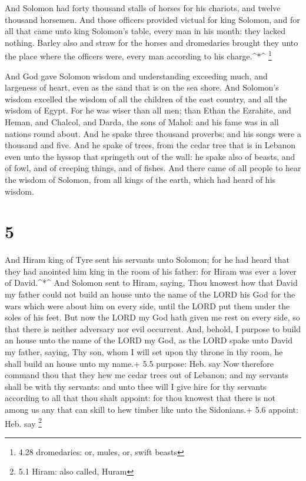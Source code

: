  And Solomon had forty thousand stalls of horses for his
chariots, and twelve thousand horsemen.  And those officers
provided victual for king Solomon, and for all that came unto king
Solomon's table, every man in his month: they lacked nothing.
 Barley also and straw for the horses and dromedaries
brought they unto the place where the officers were, every man according
to his charge.\^{}*\^{} \footnote{4.28 dromedaries: or, mules, or, swift
  beasts}

 And God gave Solomon wisdom and understanding exceeding
much, and largeness of heart, even as the sand that is on the sea shore.
 And Solomon's wisdom excelled the wisdom of all the
children of the east country, and all the wisdom of Egypt. 
For he was wiser than all men; than Ethan the Ezrahite, and Heman, and
Chalcol, and Darda, the sons of Mahol: and his fame was in all nations
round about.  And he spake three thousand proverbs: and his
songs were a thousand and five.  And he spake of trees,
from the cedar tree that is in Lebanon even unto the hyssop that
springeth out of the wall: he spake also of beasts, and of fowl, and of
creeping things, and of fishes.  And there came of all
people to hear the wisdom of Solomon, from all kings of the earth, which
had heard of his wisdom.

\hypertarget{section-4}{%
\section{5}\label{section-4}}

 And Hiram king of Tyre sent his servants unto Solomon; for
he had heard that they had anointed him king in the room of his father:
for Hiram was ever a lover of David.\^{}*\^{}  And Solomon
sent to Hiram, saying,  Thou knowest how that David my
father could not build an house unto the name of the LORD his God for
the wars which were about him on every side, until the LORD put them
under the soles of his feet.  But now the LORD my God hath
given me rest on every side, so that there is neither adversary nor evil
occurrent.  And, behold, I purpose to build an house unto
the name of the LORD my God, as the LORD spake unto David my father,
saying, Thy son, whom I will set upon thy throne in thy room, he shall
build an house unto my name.+ 5.5 purpose: Heb. say  Now
therefore command thou that they hew me cedar trees out of Lebanon; and
my servants shall be with thy servants: and unto thee will I give hire
for thy servants according to all that thou shalt appoint: for thou
knowest that there is not among us any that can skill to hew timber like
unto the Sidonians.+ 5.6 appoint: Heb. say \footnote{5.1 Hiram: also
  called, Huram}

